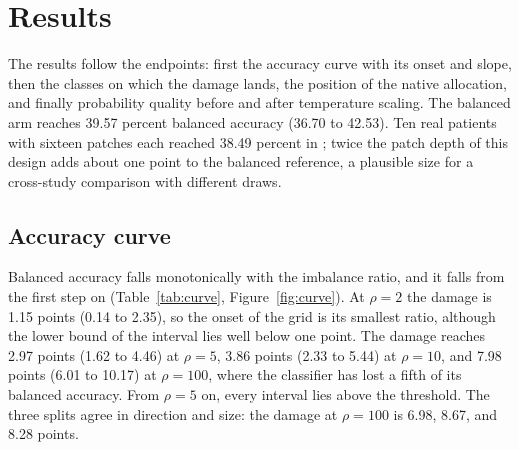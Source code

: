 \section{Results}
\label{sec:results}
The results follow the endpoints: first the accuracy curve with its onset and slope, then the classes on which the damage lands, the position of the native allocation, and finally probability quality before and after temperature scaling. The balanced arm reaches 39.57 percent balanced accuracy (36.70 to 42.53). Ten real patients with sixteen patches each reached 38.49 percent in \citet{queisler2026bracsMechanism}; twice the patch depth of this design adds about one point to the balanced reference, a plausible size for a cross-study comparison with different draws.

\subsection{Accuracy curve}
\label{sec:curve-results}
Balanced accuracy falls monotonically with the imbalance ratio, and it falls from the first step on (Table~\ref{tab:curve}, Figure~\ref{fig:curve}). At $\rho=2$ the damage is 1.15 points (0.14 to 2.35), so the onset of the grid is its smallest ratio, although the lower bound of the interval lies well below one point. The damage reaches 2.97 points (1.62 to 4.46) at $\rho=5$, 3.86 points (2.33 to 5.44) at $\rho=10$, and 7.98 points (6.01 to 10.17) at $\rho=100$, where the classifier has lost a fifth of its balanced accuracy. From $\rho=5$ on, every interval lies above the threshold. The three splits agree in direction and size: the damage at $\rho=100$ is 6.98, 8.67, and 8.28 points.

